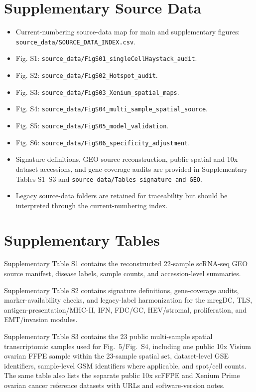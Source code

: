 \documentclass[pdflatex,sn-vancouver-num]{sn-jnl}
\begin{document}
\section*{Supplementary Source Data}
\begin{itemize}
\item Current-numbering source-data map for main and supplementary figures: \texttt{source\_data/SOURCE\_DATA\_INDEX.csv}.
\item Fig. S1: \texttt{source\_data/FigS01\_singleCellHaystack\_audit}.
\item Fig. S2: \texttt{source\_data/FigS02\_Hotspot\_audit}.
\item Fig. S3: \texttt{source\_data/FigS03\_Xenium\_spatial\_maps}.
\item Fig. S4: \texttt{source\_data/FigS04\_multi\_sample\_spatial\_source}.
\item Fig. S5: \texttt{source\_data/FigS05\_model\_validation}.
\item Fig. S6: \texttt{source\_data/FigS06\_specificity\_adjustment}.
\item Signature definitions, GEO source reconstruction, public spatial and 10x dataset accessions, and gene-coverage audits are provided in Supplementary Tables S1--S3 and \texttt{source\_data/Tables\_signature\_and\_GEO}.
\item Legacy source-data folders are retained for traceability but should be interpreted through the current-numbering index.
\end{itemize}

\section*{Supplementary Tables}
Supplementary Table S1 contains the reconstructed 22-sample scRNA-seq GEO source manifest, disease labels, sample counts, and accession-level summaries.

Supplementary Table S2 contains signature definitions, gene-coverage audits, marker-availability checks, and legacy-label harmonization for the mregDC, TLS, antigen-presentation/MHC-II, IFN, FDC/GC, HEV/stromal, proliferation, and EMT/invasion modules.

Supplementary Table S3 contains the 23 public multi-sample spatial transcriptomic samples used for Fig.~5/Fig.~S4, including one public 10x Visium ovarian FFPE sample within the 23-sample spatial set, dataset-level GSE identifiers, sample-level GSM identifiers where applicable, and spot/cell counts. The same table also lists the separate public 10x scFFPE and Xenium Prime ovarian cancer reference datasets with URLs and software-version notes.
\end{document}
